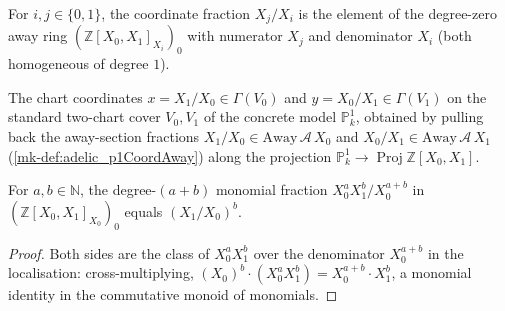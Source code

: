 \begin{definition}
  \label{mk-def:adelic_p1CoordAway}
  \leanok
  For \(i, j \in \{0, 1\}\), the coordinate fraction \(X_j/X_i\) is the
  element of the degree-zero away ring \((\mathbb{Z}[X_0,X_1]_{X_i})_0\)
  with numerator \(X_j\) and denominator \(X_i\) (both homogeneous of
  degree \(1\)).
\end{definition}

\begin{definition}
  \label{mk-def:adelic_p1_chart_sections}
  \leanok
  The chart coordinates \(x = X_1/X_0 \in \Gamma(V_0)\) and
  \(y = X_0/X_1 \in \Gamma(V_1)\) on the standard two-chart cover
  \(V_0, V_1\) of the concrete model \(\mathbb{P}^1_k\), obtained by
  pulling back the away-section fractions
  \(X_1/X_0 \in \mathrm{Away}\,\mathcal A\,X_0\) and
  \(X_0/X_1 \in \mathrm{Away}\,\mathcal A\,X_1\)
  (\ref{mk-def:adelic_p1CoordAway}) along the projection
  \(\mathbb{P}^1_k \to \operatorname{Proj}\mathbb{Z}[X_0,X_1]\).
\end{definition}

\begin{lemma}
  \label{mk-lem:adelic_p1Monomial_eq_coordPow}
  \leanok
  For \(a, b \in \mathbb{N}\), the degree-\((a+b)\) monomial fraction
  \(X_0^a X_1^b / X_0^{a+b}\) in \((\mathbb{Z}[X_0,X_1]_{X_0})_0\) equals
  \((X_1/X_0)^b\).
\end{lemma}
\begin{proof}
  \leanok
  Both sides are the class of \(X_0^a X_1^b\) over the denominator
  \(X_0^{a+b}\) in the localisation: cross-multiplying,
  \((X_0)^b \cdot (X_0^a X_1^b) = X_0^{a+b} \cdot X_1^b\), a monomial
  identity in the commutative monoid of monomials.
\end{proof}

